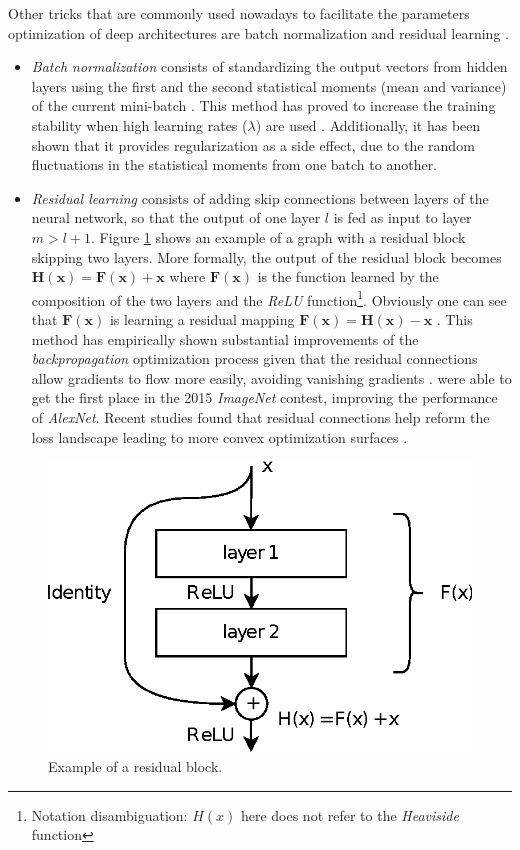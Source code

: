 Other tricks that are commonly used nowadays to facilitate the parameters optimization of deep architectures are batch normalization \autocite{ioffe2015} and residual learning \autocite{kaiming2016}. 
\begin{itemize}
	\item \textit{Batch normalization} consists of standardizing the output vectors from hidden layers using the first and the second statistical moments (mean and variance) of the current mini-batch \autocite{ioffe2015}. This method has proved to increase the training stability when high learning rates ($\lambda$) are used \autocite{Goodfellow2016}. Additionally, it has been shown that it provides regularization \autocite{dauphin2021} as a side effect, due to the random fluctuations in the statistical moments from one batch to another.
	\item \textit{Residual learning} consists of adding skip connections between layers of the neural network, so that the output of one layer $l$ is fed as input to layer $m > l+1$. Figure \ref{fig:residual} shows an example of a graph with a residual block skipping two layers. More formally, the output of the residual block becomes $\mathbf{H(x)} = \mathbf{F(x)} + \mathbf{x}$ where $\mathbf{F(x)}$ is the function learned by the composition of the two layers and the \textit{ReLU} function\footnote{Notation disambiguation: $H(x)$ here does not refer to the \textit{Heaviside} function}. Obviously one can see that $\mathbf{F(x)}$ is learning a residual mapping $\mathbf{F(x)} = \mathbf{H(x)} - \mathbf{x}$ \autocite{kaiming2016}. This method has empirically shown substantial improvements of the \textit{backpropagation} optimization process given that the residual connections allow gradients to flow more easily, avoiding vanishing gradients \autocite{Goodfellow2016}. \citealp{kaiming2016} were able to get the first place in the 2015 \textit{ImageNet} contest, improving the performance of \textit{AlexNet}. Recent studies found that residual connections help reform the loss landscape leading to more convex optimization surfaces \autocite{freeman2017, wang2020a}.
\end{itemize}
 


\begin{figure}[h!]
	\centering
	\includegraphics[width=0.5\linewidth]{background/images/residual}
	\caption[Example of a residual block]{Example of a residual block.}
	\label{fig:residual}
\end{figure}


